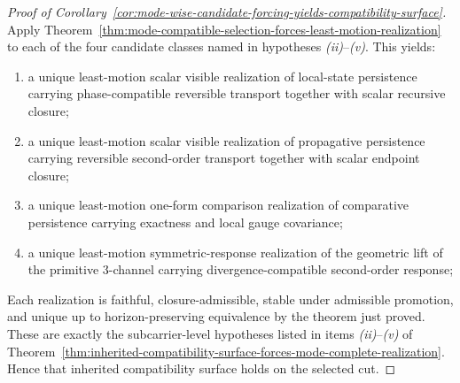 \begin{proof}[Proof of Corollary~\ref{cor:mode-wise-candidate-forcing-yields-compatibility-surface}]
\label{proof:cor:mode-wise-candidate-forcing-yields-compatibility-surface}
Apply
Theorem~\ref{thm:mode-compatible-selection-forces-least-motion-realization} to
each of the four candidate classes named in hypotheses
\emph{(ii)}--\emph{(v)}. This yields:
\begin{enumerate}[label=(\alph*), leftmargin=2em, itemsep=0.2em]
\item a unique least-motion scalar visible realization of local-state
      persistence carrying phase-compatible reversible transport together with
      scalar recursive closure;
\item a unique least-motion scalar visible realization of propagative
      persistence carrying reversible second-order transport together with
      scalar endpoint closure;
\item a unique least-motion one-form comparison realization of comparative
      persistence carrying exactness and local gauge covariance;
\item a unique least-motion symmetric-response realization of the geometric
      lift of the primitive \(3\)-channel carrying divergence-compatible
      second-order response;
\end{enumerate}
Each realization is faithful, closure-admissible, stable under admissible
promotion, and unique up to horizon-preserving equivalence by the theorem just
proved. These are exactly the subcarrier-level hypotheses listed in items
\emph{(ii)}--\emph{(v)} of
Theorem~\ref{thm:inherited-compatibility-surface-forces-mode-complete-realization}.
Hence that inherited compatibility surface holds on the selected cut.
\end{proof}

